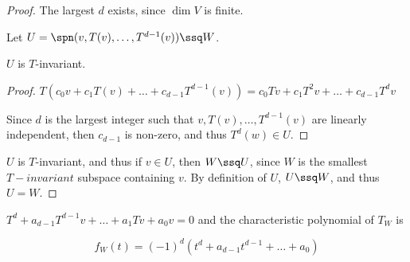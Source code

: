 \documentclass[11pt]{scrartcl}
\begin{document}
\begin{proof}
  The largest $d$ exists, since $\dim V$ is finite.

  Let $U = \spn(v, T(v), \dots, T^{d-1}(v))\ssq W$.

  \begin{claim*}
    $U$ is $T$-invariant.
  \end{claim*}

  \begin{proof}
     $T(c_0v + c_1T(v)+\dots+c_{d-1}T^{d-1}(v)) = c_0Tv + c_1T^2v +\dots + c_{d-1}T^dv$

     Since $d$ is the largest integer such that
     $v, T(v), \dots, T^{d-1}(v)$ are linearly independent, then
     $c_{d-1}$ is non-zero, and thus $T^d(w) \in U$.
  \end{proof}

  $U$ is $T$-invariant, and thus if $v\in U$, then $W\ssq U$, since
  $W$ is the smallest $T-invariant$ subspace containing $v$. By
  definition of $U$, $U \ssq W$, and thus $U = W$.

\end{proof}

\begin{theorem}
  \label{sec:cycl}
  $T^d+a_{d-1}T^{d-1}v+\dots+a_1Tv+a_0v = 0$ and the characteristic polynomial of $T_{W}$ is

  \begin{equation*}
    f_W(t) = (-1)^d(t^d+a_{d-1}t^{d-1}+\dots+a_0)
  \end{equation*}
\end{theorem}
\end{document}
